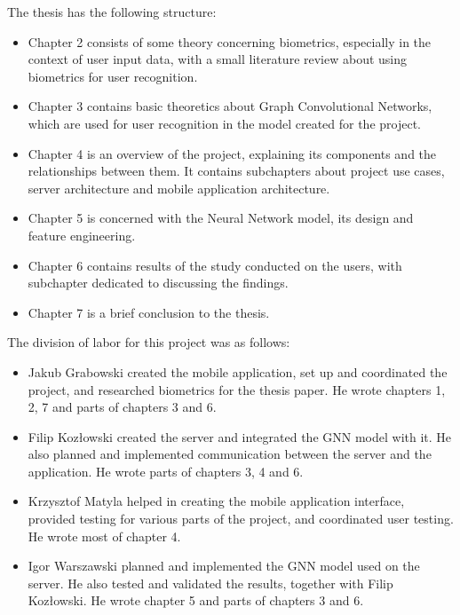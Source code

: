 The thesis has the following structure:
\begin{itemize}
    \item Chapter 2 consists of some theory concerning biometrics, especially in the context of user input data, with a small literature review about using biometrics for user recognition.
    \item Chapter 3 contains basic theoretics about Graph Convolutional Networks, which are used for user recognition in the model created for the project.
    \item Chapter 4 is an overview of the project, explaining its components and the relationships between them. It contains subchapters about project use cases, server architecture and mobile application architecture.
    \item Chapter 5 is concerned with the Neural Network model, its design and feature engineering.
    \item Chapter 6 contains results of the study conducted on the users, with subchapter dedicated to discussing the findings.
    \item Chapter 7 is a brief conclusion to the thesis.
\end{itemize}

The division of labor for this project was as follows:
\begin{itemize}
    \item Jakub Grabowski created the mobile application, set up and coordinated the project, and researched biometrics for the thesis paper. He wrote chapters 1, 2, 7 and parts of chapters 3 and 6.
    \item Filip Kozłowski created the server and integrated the GNN model with it. He also planned and implemented communication between the server and the application. He wrote parts of chapters 3, 4 and 6. 
    \item Krzysztof Matyla helped in creating the mobile application interface, provided testing for various parts of the project, and coordinated user testing. He wrote most of chapter 4.
    \item Igor Warszawski planned and implemented the GNN model used on the server. He also tested and validated the results, together with Filip Kozłowski. He wrote chapter 5 and parts of chapters 3 and 6.
\end{itemize}
